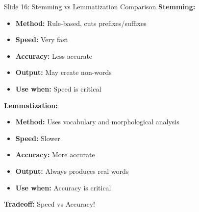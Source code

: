 \documentclass[8pt]{beamer}
\begin{document}
	\begin{frame}{Slide 16: Stemming vs Lemmatization Comparison}
		\fontsize{6.5}{7.5}\selectfont
		\textbf{Stemming:}
		\begin{itemize}
			\item \textbf{Method:} Rule-based, cuts prefixes/suffixes
			\item \textbf{Speed:} Very fast
			\item \textbf{Accuracy:} Less accurate
			\item \textbf{Output:} May create non-words
			\item \textbf{Use when:} Speed is critical
		\end{itemize}
		
		\vspace{0.1cm}
		\textbf{Lemmatization:}
		\begin{itemize}
			\item \textbf{Method:} Uses vocabulary and morphological analysis
			\item \textbf{Speed:} Slower
			\item \textbf{Accuracy:} More accurate
			\item \textbf{Output:} Always produces real words
			\item \textbf{Use when:} Accuracy is critical
		\end{itemize}
		
		\textcolor{myblue}{\textbf{Tradeoff:}} Speed vs Accuracy!
	\end{frame}
	
\end{document}
